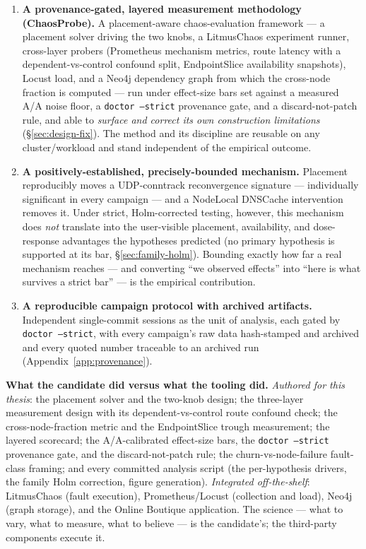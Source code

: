 \begin{enumerate}
\item \textbf{A provenance-gated, layered measurement methodology
  (ChaosProbe).} A placement-aware chaos-evaluation framework --- a placement
  solver driving the two knobs, a LitmusChaos experiment runner, cross-layer
  probers (Prometheus mechanism metrics, route latency with a
  dependent-vs-control confound split, EndpointSlice availability snapshots),
  Locust load, and a Neo4j dependency graph from which the cross-node fraction
  is computed --- run under effect-size bars set against a measured A/A noise
  floor, a \texttt{doctor --strict} provenance gate, and a discard-not-patch
  rule, and able to \emph{surface and correct its own construction limitations}
  (\S\ref{sec:design-fix}). The method and its discipline are reusable on any
  cluster/workload and stand independent of the empirical outcome.

\item \textbf{A positively-established, precisely-bounded mechanism.} Placement
  reproducibly moves a UDP-conntrack reconvergence signature --- individually
  significant in every campaign --- and a NodeLocal DNSCache intervention
  removes it. Under strict, Holm-corrected testing, however, this mechanism does
  \emph{not} translate into the user-visible placement, availability, and
  dose-response advantages the hypotheses predicted (no primary hypothesis
  is supported at its bar, \S\ref{sec:family-holm}). Bounding exactly
  how far a real mechanism reaches --- and converting ``we observed effects''
  into ``here is what survives a strict bar'' --- is the empirical contribution.

\item \textbf{A reproducible campaign protocol with archived artifacts.}
  Independent single-commit sessions as the unit of analysis, each gated by
  \texttt{doctor --strict}, with every campaign's raw data hash-stamped and
  archived and every quoted number traceable to an archived run
  (Appendix~\ref{app:provenance}).
\end{enumerate}

\textbf{What the candidate did versus what the tooling did.} \emph{Authored for
this thesis}: the placement solver and the two-knob design; the three-layer
measurement design with its dependent-vs-control route confound check; the
cross-node-fraction metric and the EndpointSlice trough measurement; the layered
scorecard; the A/A-calibrated effect-size bars, the \texttt{doctor --strict}
provenance gate, and the discard-not-patch rule; the
churn-vs-node-failure fault-class framing; and every committed analysis script
(the per-hypothesis drivers, the family Holm correction, figure generation).
\emph{Integrated off-the-shelf}: LitmusChaos (fault execution),
Prometheus/Locust (collection and load), Neo4j (graph storage), and the Online
Boutique application. The science --- what to vary, what to measure, what to
believe --- is the candidate's; the third-party components execute it.

